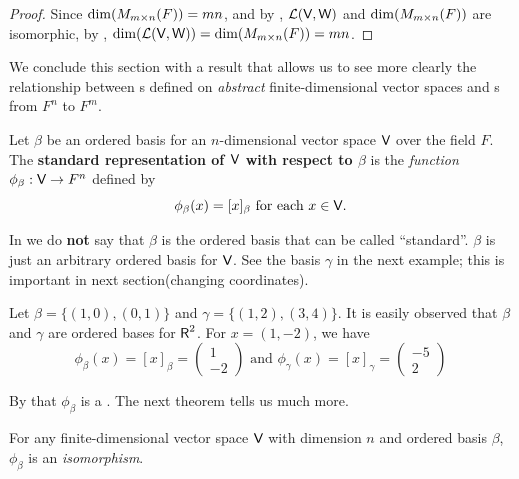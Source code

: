 \begin{proof}
Since \(\dim(M_{m \times n}(F)) = mn\), and by , \(\mathcal{L}(\textsf{V}, \textsf{W})\) and \(\dim(M_{m \times n}(F))\) are isomorphic, by , \(\dim(\mathcal{L}(\textsf{V}, \textsf{W})) = \dim(M_{m \times n}(F)) = mn\).
\end{proof}

We conclude this section with a result that allows us to see more clearly the relationship between \LTRAN{}s defined on \emph{abstract} finite-dimensional vector spaces and \LTRAN{}s from \(F^n\) to \(F^m\).

\begin{definition} \label{def 2.15}
Let \(\beta\) be an ordered basis for an \(n\)-dimensional vector space \(\textsf{V}\) over the field \(F\).
The \textbf{standard representation of \(\textsf{V}\) with respect to \(\beta\)} is the \emph{function} \(\phi_{\beta} : \textsf{V} \to F^n\) defined by
\[
    \phi_{\beta}(x) = [x]_{\beta} \text{ for each } x \in \textsf{V}.
\]
\end{definition}

\begin{note}
In  we do \textbf{not} say that \(\beta\) is the ordered basis that can be called ``standard''.
\(\beta\) is just an arbitrary ordered basis for \(\textsf{V}\).
See the basis \(\gamma\) in the next example; this is important in next section(changing coordinates).
\end{note}

\begin{example} \label{example 2.4.6}
Let \(\beta = \{ (1, 0), (0, 1) \}\) and \(\gamma = \{ (1, 2), (3, 4) \}\).
It is easily observed that \(\beta\) and \(\gamma\) are ordered bases for \(\textsf{R}^2\).
For \(x = (1, -2)\), we have
\[
    \phi_{\beta}(x) = [x]_{\beta} = \begin{pmatrix} 1 \\ -2 \end{pmatrix}
    \text{ and }
    \phi_{\gamma}(x) = [x]_{\gamma} = \begin{pmatrix} -5 \\ 2 \end{pmatrix}
\]
\end{example}

By  that \(\phi_{\beta}\) is a \LTRAN{}.
The next theorem tells us much more.

\begin{theorem} \label{thm 2.21}
For any finite-dimensional vector space \(\textsf{V}\) with dimension \(n\) and ordered basis \(\beta\), \(\phi_{\beta}\) is an \emph{isomorphism}.
\end{theorem}

